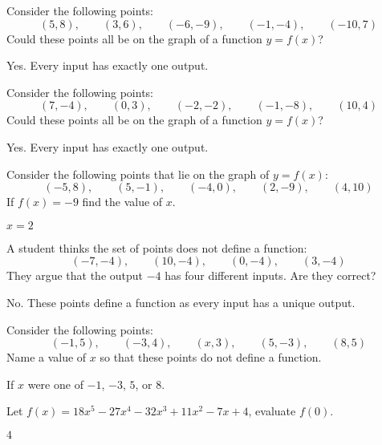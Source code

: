 \begin{exercises}
\begin{exercise} Consider the following points:
\[
(5,8),\qquad (3,6), \qquad(-6,-9), \qquad(-1,-4), \qquad(-10,7)
\]
Could these points all be on the graph of a function $y =f(x)$?
\begin{answer}
Yes.  Every input has exactly one output.
\end{answer}
\end{exercise}


\begin{exercise} Consider the following points:
\[
(7,-4),\qquad (0,3), \qquad(-2,-2), \qquad(-1,-8), \qquad(10,4)
\]
Could these points all be on the graph of a function $y =f(x)$?
\begin{answer}
Yes.  Every input has exactly one output.
\end{answer}
\end{exercise}


\begin{exercise} Consider the following points that lie on the graph of $y =f(x)$:
\[
(-5,8),\qquad (5,-1), \qquad(-4,0), \qquad(2,-9), \qquad(4,10)
\]
If $f(x)=-9$ find the value of $x$.
\begin{answer}
$x=2$
\end{answer}
\end{exercise}

\begin{exercise} A student thinks the set of points does not define a function:
\[
(-7,-4),\qquad (10,-4), \qquad(0,-4), \qquad(3,-4)
\]
They argue that the output $-4$ has four different inputs.  Are they
correct?
\begin{answer}
No.  These points define a function as every input has a unique output.
\end{answer}
\end{exercise}

\begin{exercise} Consider the following points:
\[
(-1,5),\qquad (-3,4), \qquad(x,3), \qquad(5,-3), \qquad(8,5)
\]
Name a value of $x$ so that these points do not define a function. 
\begin{answer}
If $x$ were one of $-1$, $-3$, $5$, or $8$.
\end{answer}
\end{exercise}

\begin{exercise} Let $f(x) = 18x^5-27x^4-32x^3+11x^2 -7x +4$, evaluate $f(0)$.
\begin{answer}
$4$
\end{answer}
\end{exercise}


\end{exercises}
